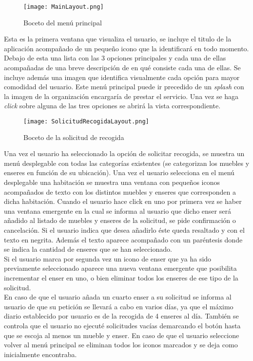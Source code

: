  \begin{figure}[H]
\centering
	\texttt{[image: MainLayout.png]} 
\caption{Boceto del menú principal}
\end{figure}
Esta es la primera ventana que visualiza el usuario, se incluye el titulo de la aplicación acompañado de un pequeño icono que la identificará en todo momento. Debajo de esta una lista con las 3 opciones principales y cada una de ellas acompañadas de una breve descripción de en qué consiste cada una de ellas. Se incluye además una imagen que identifica visualmente cada opción para mayor comodidad del usuario. Este menú principal puede ir precedido de un \textit{splash} con la imagen de la organización encargaría de prestar el servicio. Una vez se haga \textit{click} sobre alguna de las tres opciones se abrirá la vista correspondiente. 
 \begin{figure}[H]
\centering
	\texttt{[image: SolicitudRecogidaLayout.png]} 
\caption{Boceto de la solicitud de recogida}
\end{figure}
Una vez el usuario ha seleccionado la opción de solicitar recogida, se muestra un menú desplegable con todas las categorías existentes (se categorizan los muebles y enseres en función de su ubicación). Una vez el usuario selecciona en el menú desplegable una habitación se muestra una ventana con pequeños iconos acompañados de texto con los distintos muebles y enseres que corresponden a dicha habitación. Cuando el usuario hace click en uno por primera vez se haber una ventana emergente en la cual se informa al usuario que dicho enser será añadido al listado de muebles y enseres de la solicitud, se pide confirmación o cancelación. Si el usuario indica que desea añadirlo éste queda resaltado y con el texto en negrita. Además el texto aparece acompañado con un paréntesis donde se indica la cantidad de enseres que se han seleccionado. \\
Si el usuario marca por segunda vez un icono de enser que ya ha sido previamente seleccionado aparece una nueva ventana emergente que posibilita incrementar el enser en uno, o bien eliminar todos los enseres de ese tipo de la solicitud. \\
En caso de que el usuario añada un cuarto enser a su solicitud se informa al usuario de que su petición se llevará a cabo en varios días, ya que el máximo diario establecido por usuario es de la recogida de 4 enseres al día. También se controla que el usuario no ejecuté solicitudes vacías demarcando el botón hasta que se escoja al menos un mueble y enser. En caso de que el usuario seleccione volver al menú principal se eliminan todos los iconos marcados y se deja como inicialmente encontraba. 
